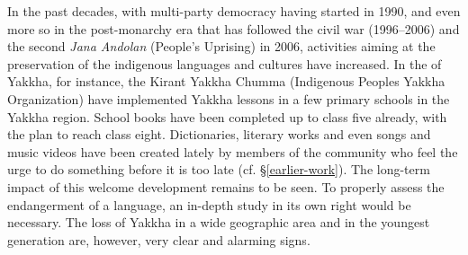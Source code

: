 In the past decades, with multi-party democracy having started in 1990, and even more so in the post-monarchy era that has followed the civil war (1996–2006) and the second \emph{Jana Andolan} (People's Uprising) in 2006, activities aiming at the preservation of the indigenous languages and cultures have increased. In the  of Yakkha, for instance, the Kirant Yakkha Chumma (Indigenous Peoples Yakkha Organization) have implemented Yakkha lessons in a few primary schools in the Yakkha region.  School books have been completed up to class five already, with the plan to reach class eight. Dictionaries, literary works and even songs and music videos have been created lately by members of the community who feel the urge to do something before it is too late (cf. §\ref{earlier-work}). The long-term impact of this welcome development remains to be seen. To properly assess the endangerment of a language, an in-depth study in its own right would be necessary. The loss of Yakkha in a wide geographic area and in the youngest generation are, however, very clear and alarming signs.





